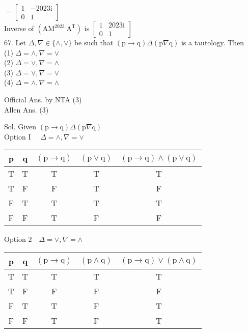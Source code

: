 \documentclass[10pt]{article}
\begin{document}
\(=\left[\begin{array}{cc}1 & -2023 \mathrm{i} \\ 0 & 1\end{array}\right]\)\\
Inverse of \(\left(\mathrm{AM}^{2023} \mathrm{~A}^{\mathrm{T}}\right)\) is \(\left[\begin{array}{cc}1 & 2023 \mathrm{i} \\ 0 & 1\end{array}\right]\)\\
67. Let \(\Delta, \nabla \in\{\wedge, \vee\}\) be such that \((\mathrm{p} \rightarrow \mathrm{q}) \Delta(\mathrm{p} \nabla \mathrm{q})\) is a tautology. Then\\
(1) \(\Delta=\wedge, \nabla=\vee\)\\
(2) \(\Delta=\vee, \nabla=\wedge\)\\
(3) \(\Delta=\vee, \nabla=\vee\)\\
(4) \(\Delta=\wedge, \nabla=\wedge\)

Official Ans. by NTA (3)\\
Allen Ans. (3)

Sol. Given \((\mathrm{p} \rightarrow \mathrm{q}) \Delta(\mathrm{p} \nabla \mathrm{q})\)\\
Option I \(\quad \Delta=\wedge, \nabla=\vee\)

\begin{center}
\begin{tabular}{|c|c|c|c|c|}
\hline
p & q & \((\mathrm{p} \rightarrow \mathrm{q})\) & \((\mathrm{p} \vee \mathrm{q})\) & \((\mathrm{p} \rightarrow \mathrm{q}) \wedge(\mathrm{p} \vee \mathrm{q})\) \\
\hline
T & T & T & T & T \\
\hline
T & F & F & T & F \\
\hline
F & T & T & T & T \\
\hline
F & F & T & F & F \\
\hline
\end{tabular}
\end{center}

Option \(2 \quad \Delta=\vee, \nabla=\wedge\)

\begin{center}
\begin{tabular}{|c|c|c|c|c|}
\hline
p & q & \((\mathrm{p} \rightarrow \mathrm{q})\) & \((\mathrm{p} \wedge \mathrm{q})\) & \((\mathrm{p} \rightarrow \mathrm{q}) \vee(\mathrm{p} \wedge \mathrm{q})\) \\
\hline
T & T & T & T & T \\
\hline
T & F & F & F & F \\
\hline
F & T & T & F & T \\
\hline
F & F & T & F & T \\
\hline
\end{tabular}
\end{center}
\end{document}
